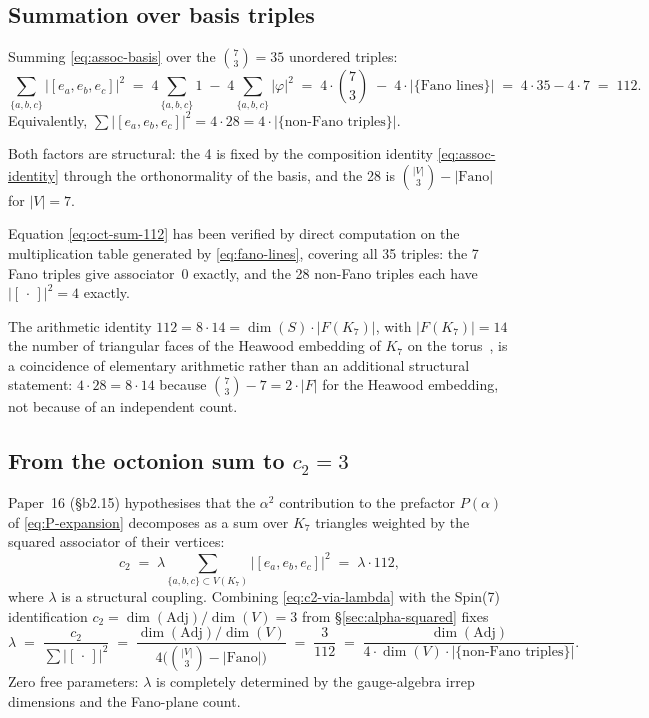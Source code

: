 \documentclass[11pt]{article}
\newcommand{\Adj}{\mathrm{Adj}}
\begin{document}
\subsection{Summation over basis triples}
\label{sec:oct-sum}

Summing \eqref{eq:assoc-basis} over the
$\binom{7}{3} = 35$ unordered triples:
\begin{equation}
  \sum_{\{a,b,c\}} |[e_a, e_b, e_c]|^2
    \;=\; 4\!\sum_{\{a,b,c\}}\!1 \;-\; 4\!\sum_{\{a,b,c\}}\!|\varphi|^2
    \;=\; 4\cdot\binom{7}{3} \;-\; 4\cdot |\{\text{Fano lines}\}|
    \;=\; 4\cdot 35 - 4\cdot 7
    \;=\; \boxed{112}.
  \label{eq:oct-sum-112}
\end{equation}
Equivalently,
$\sum |[e_a, e_b, e_c]|^2 = 4 \cdot 28 = 4 \cdot |\{\text{non-Fano triples}\}|$.

Both factors are structural: the 4 is fixed by the composition
identity \eqref{eq:assoc-identity} through the orthonormality of
the basis, and the 28 is
$\binom{|V|}{3} - |\mathrm{Fano}|$ for $|V| = 7$.

Equation \eqref{eq:oct-sum-112} has been verified by direct
computation on the multiplication table generated by
\eqref{eq:fano-lines}, covering all 35 triples: the 7 Fano triples
give associator~$0$ exactly, and the 28 non-Fano triples each
have $|[\,\cdot\,]|^2 = 4$ exactly.

The arithmetic identity $112 = 8 \cdot 14 = \dim(S)\cdot |F(K_7)|$,
with $|F(K_7)| = 14$ the number of triangular faces of the
Heawood embedding of $K_7$ on the torus~\cite{ringel-youngs},
is a coincidence of elementary arithmetic rather than an
additional structural statement: $4 \cdot 28 = 8 \cdot 14$ because
$\binom{7}{3} - 7 = 2 \cdot |F|$ for the Heawood embedding, not
because of an independent count.

\subsection{From the octonion sum to $c_2 = 3$}
\label{sec:oct-lambda}

Paper~16 (\S b2.15) hypothesises that the $\alpha^2$ contribution
to the prefactor $P(\alpha)$ of \eqref{eq:P-expansion}
decomposes as a sum over $K_7$ triangles weighted by the squared
associator of their vertices:
\begin{equation}
  c_2 \;=\;
  \lambda \sum_{\{a,b,c\}\subset V(K_7)} |[e_a, e_b, e_c]|^2
  \;=\; \lambda \cdot 112,
  \label{eq:c2-via-lambda}
\end{equation}
where $\lambda$ is a structural coupling.  Combining
\eqref{eq:c2-via-lambda} with the Spin(7) identification
$c_2 = \dim(\Adj)/\dim(V) = 3$ from
\S\ref{sec:alpha-squared} fixes
\begin{equation}
  \lambda \;=\; \frac{c_2}{\sum |[\,\cdot\,]|^2}
    \;=\; \frac{\dim(\Adj)/\dim(V)}
               {4 \bigl(\binom{|V|}{3} - |\mathrm{Fano}|\bigr)}
    \;=\; \frac{3}{112}
    \;=\; \frac{\dim(\Adj)}
               {4 \cdot \dim(V) \cdot |\{\text{non-Fano triples}\}|}.
  \label{eq:lambda-struct}
\end{equation}
Zero free parameters: $\lambda$ is completely determined by the
gauge-algebra irrep dimensions and the Fano-plane count.
\end{document}
